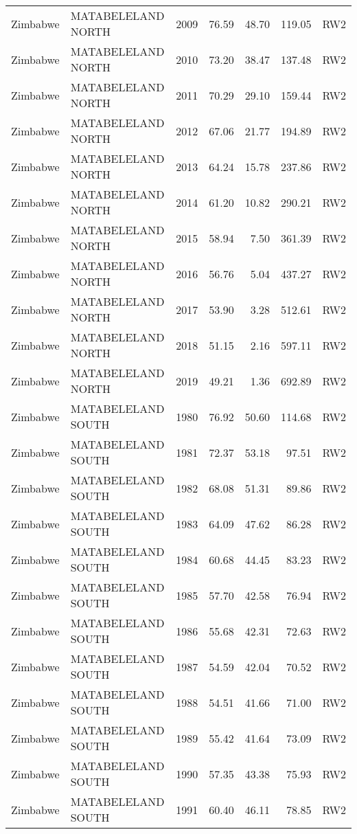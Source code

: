 \begin{longtable}{lllrrrl}
  Zimbabwe & MATABELELAND NORTH & 2009 & 76.59 & 48.70 & 119.05 & RW2 \\ 
  Zimbabwe & MATABELELAND NORTH & 2010 & 73.20 & 38.47 & 137.48 & RW2 \\ 
  Zimbabwe & MATABELELAND NORTH & 2011 & 70.29 & 29.10 & 159.44 & RW2 \\ 
  Zimbabwe & MATABELELAND NORTH & 2012 & 67.06 & 21.77 & 194.89 & RW2 \\ 
  Zimbabwe & MATABELELAND NORTH & 2013 & 64.24 & 15.78 & 237.86 & RW2 \\ 
  Zimbabwe & MATABELELAND NORTH & 2014 & 61.20 & 10.82 & 290.21 & RW2 \\ 
  Zimbabwe & MATABELELAND NORTH & 2015 & 58.94 & 7.50 & 361.39 & RW2 \\ 
  Zimbabwe & MATABELELAND NORTH & 2016 & 56.76 & 5.04 & 437.27 & RW2 \\ 
  Zimbabwe & MATABELELAND NORTH & 2017 & 53.90 & 3.28 & 512.61 & RW2 \\ 
  Zimbabwe & MATABELELAND NORTH & 2018 & 51.15 & 2.16 & 597.11 & RW2 \\ 
  Zimbabwe & MATABELELAND NORTH & 2019 & 49.21 & 1.36 & 692.89 & RW2 \\ 
  Zimbabwe & MATABELELAND SOUTH & 1980 & 76.92 & 50.60 & 114.68 & RW2 \\ 
  Zimbabwe & MATABELELAND SOUTH & 1981 & 72.37 & 53.18 & 97.51 & RW2 \\ 
  Zimbabwe & MATABELELAND SOUTH & 1982 & 68.08 & 51.31 & 89.86 & RW2 \\ 
  Zimbabwe & MATABELELAND SOUTH & 1983 & 64.09 & 47.62 & 86.28 & RW2 \\ 
  Zimbabwe & MATABELELAND SOUTH & 1984 & 60.68 & 44.45 & 83.23 & RW2 \\ 
  Zimbabwe & MATABELELAND SOUTH & 1985 & 57.70 & 42.58 & 76.94 & RW2 \\ 
  Zimbabwe & MATABELELAND SOUTH & 1986 & 55.68 & 42.31 & 72.63 & RW2 \\ 
  Zimbabwe & MATABELELAND SOUTH & 1987 & 54.59 & 42.04 & 70.52 & RW2 \\ 
  Zimbabwe & MATABELELAND SOUTH & 1988 & 54.51 & 41.66 & 71.00 & RW2 \\ 
  Zimbabwe & MATABELELAND SOUTH & 1989 & 55.42 & 41.64 & 73.09 & RW2 \\ 
  Zimbabwe & MATABELELAND SOUTH & 1990 & 57.35 & 43.38 & 75.93 & RW2 \\ 
  Zimbabwe & MATABELELAND SOUTH & 1991 & 60.40 & 46.11 & 78.85 & RW2 \\ 

\end{longtable}
